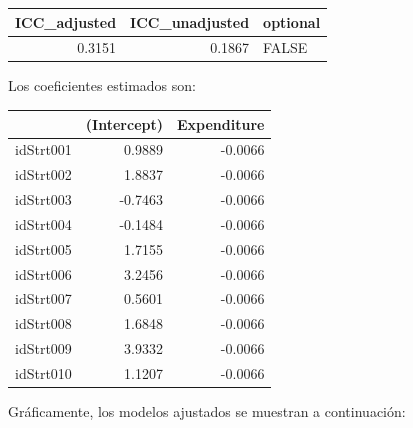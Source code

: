 \documentclass[
  12pt,
]{book}
\newenvironment{Shaded}{\begin{snugshade}}{\end{snugshade}}
\newcommand{\DecValTok}[1]{\textcolor[rgb]{0.00,0.00,0.81}{#1}}
\newcommand{\FunctionTok}[1]{\textcolor[rgb]{0.00,0.00,0.00}{#1}}
\newcommand{\NormalTok}[1]{#1}
\newcommand{\SpecialCharTok}[1]{\textcolor[rgb]{0.00,0.00,0.00}{#1}}
\begin{document}
\begin{tabular}{r|r|l}
\hline
ICC\_adjusted & ICC\_unadjusted & optional\\
\hline
0.3151 & 0.1867 & FALSE\\
\hline
\end{tabular}

Los coeficientes estimados son:

\begin{Shaded}
\end{Shaded}

\begin{tabular}{l|r|r}
\hline
  & (Intercept) & Expenditure\\
\hline
idStrt001 & 0.9889 & -0.0066\\
\hline
idStrt002 & 1.8837 & -0.0066\\
\hline
idStrt003 & -0.7463 & -0.0066\\
\hline
idStrt004 & -0.1484 & -0.0066\\
\hline
idStrt005 & 1.7155 & -0.0066\\
\hline
idStrt006 & 3.2456 & -0.0066\\
\hline
idStrt007 & 0.5601 & -0.0066\\
\hline
idStrt008 & 1.6848 & -0.0066\\
\hline
idStrt009 & 3.9332 & -0.0066\\
\hline
idStrt010 & 1.1207 & -0.0066\\
\hline
\end{tabular}

Gráficamente, los modelos ajustados se muestran a continuación:
\end{document}
